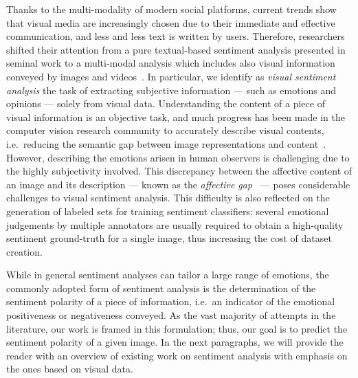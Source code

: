 Thanks to the multi-modality of modern social platforms, current trends show that visual media are increasingly chosen due to their immediate and effective communication, and less and less text is written by users.
Therefore, researchers shifted their attention from a pure textual-based sentiment analysis presented in seminal work to a multi-modal analysis which includes also visual information conveyed by images and videos~\cite{borth2013large,cao2016cross,jou2015visual,siersdorfer2010analyzing,you2015robust,you2016cross}.
In particular, we identify as \emph{visual sentiment analysis} the task of extracting subjective information --- such as emotions and opinions --- solely from visual data.
Understanding the content of a piece of visual information is an objective task, and much progress has been made in the computer vision research community to accurately describe visual contents, i.e.\ reducing the semantic gap between image representations and content~\cite{li2016socializing}.
However, describing the emotions arisen in human observers is challenging due to the highly subjectivity involved.
This discrepancy between the affective content of an image and its description --- known as the \emph{affective gap}~\cite{siersdorfer2010analyzing} --- poses considerable challenges to visual sentiment analysis.
This difficulty is also reflected on the generation of labeled sets for training sentiment classifiers;
several emotional judgements by multiple annotators are usually required to obtain a high-quality sentiment ground-truth for a single image, thus increasing the cost of dataset creation.

While in general sentiment analyses can tailor a large range of emotions, the commonly adopted form of sentiment analysis is the determination of the sentiment polarity of a piece of information, i.e.\ an indicator of the emotional positiveness or negativeness conveyed.
As the vast majority of attempts in the literature, our work is framed in this formulation;
thus, our goal is to predict the sentiment polarity of a given image. %
In the next paragraphs, we will provide the reader with an overview of existing work on sentiment analysis with emphasis on the ones based on visual data.

